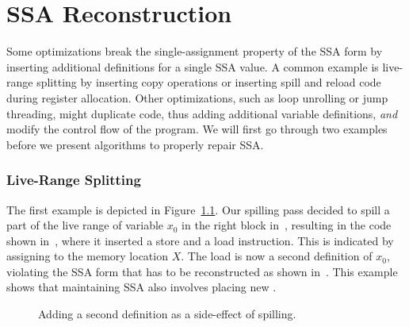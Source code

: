 
\chapter{SSA Reconstruction }
\label{chapter:repair_maintain_ssa_after_optimization}

{
\def\pendphi{pending\_$\phi$\xspace}


Some optimizations break the single-assignment property of the SSA form by inserting additional definitions for a single SSA value.
A common example is live-range splitting by inserting copy operations or inserting spill and reload code during register allocation.
Other optimizations, such as loop unrolling or jump threading, might duplicate code, thus adding additional variable definitions, \emph{and} modify the control flow of the program.
We will first go through two examples before we present algorithms to properly repair SSA.

\subsection{Live-Range Splitting}

The first example is depicted in Figure~\ref{fig:ex1}.
Our spilling pass decided to spill a part of the live range of variable $x_0$
in the right block in~, resulting in the code shown
in~,
where it inserted a store and a load instruction.
This is indicated by assigning to the memory location $X$.
The load is now a second definition of $x_0$, violating the SSA form that has
to be reconstructed as shown in~.
This example shows that maintaining SSA also involves placing new \phifuns.

\begin{figure}[htbp]
  {\def\back{\kern1pt}
	\centering
        \back
        \back
      }
	\caption{Adding a second definition as a side-effect of spilling.}
	\label{fig:ex1}
\end{figure}

}
